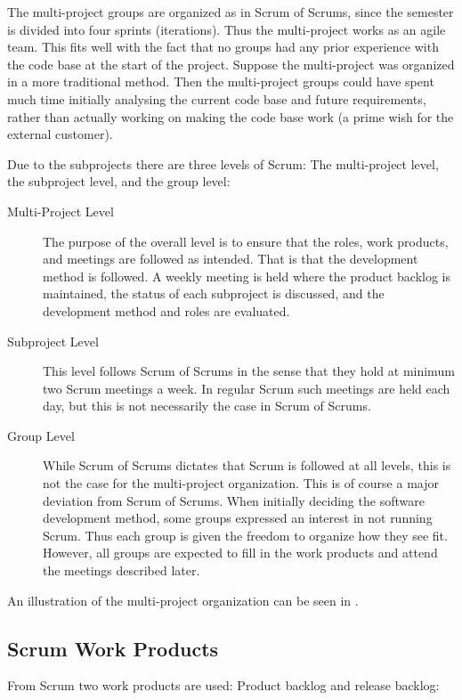 The multi-project groups are organized as in Scrum of Scrums, since the semester is divided into four sprints (iterations). Thus the multi-project works as an agile team. This fits well with the fact that no groups had any prior experience with the code base at the start of the project. Suppose the multi-project was organized in a more traditional method. Then the multi-project groups could have spent much time initially analysing the current code base and future requirements, rather than actually working on making the code base work (a prime wish for the external customer).

Due to the subprojects there are three levels of Scrum: The multi-project level, the subproject level, and the group level:

\begin{description}
  \item[Multi-Project Level] The purpose of the overall level is to ensure that the roles, work products, and meetings are followed as intended. That is that the development method is followed. A weekly meeting is held where the product backlog is maintained, the status of each subproject is discussed, and the development method and roles are evaluated.
  \item[Subproject Level] This level follows Scrum of Scrums in the sense that they hold at minimum two Scrum meetings a week. In regular Scrum such meetings are held each day, but this is not necessarily the case in Scrum of Scrums.
  \item[Group Level] While Scrum of Scrums dictates that Scrum is followed at all levels, this is not the case for the multi-project organization. This is of course a major deviation from Scrum of Scrums. When initially deciding the software development method, some groups expressed an interest in not running Scrum. Thus each group is given the freedom to organize how they see fit. However, all groups are expected to fill in the work products and attend the meetings described later.
\end{description}

An illustration of the multi-project organization can be seen in .


\subsection{Scrum Work Products}
From Scrum two work products are used: Product backlog and release backlog:

